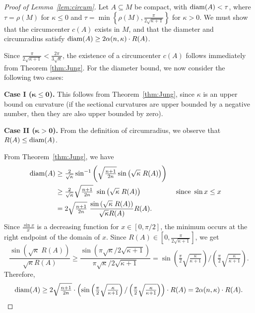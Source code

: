 \documentclass[11pt, reqno, english]{amsart}
\begin{document}
\begin{proof}[Proof of Lemma~\ref{lem:circum}]
Let $A\subseteq M$ be compact, with $\mathrm{diam}(A)< \tau$, where $\tau=\rho(M)$ for $\kappa\le 0$ and $\tau=\min\left\{\rho(M),\tfrac{\pi}{2\sqrt{\kappa+1}}\right\}$ for $\kappa>0$.
We must show that the circumcenter $c(A)$ exists in $M$, and that the diameter and circumradius satisfy $\mathrm{diam}(A)\geq2\alpha(n,\kappa)\cdot R(A)$.

Since $\tfrac{\pi}{2\sqrt{\kappa+1}}<\tfrac{2\pi}{3\sqrt{\kappa}}$, the existence of a circumcenter $c(A)$ follows immediately from Theorem \ref{thm:Jung}. For the diameter bound, we now consider the following two cases:

\noindent\textbf{Case I ($\pmb{\kappa\leq 0}$).}
This follows from Theorem~\ref{thm:Jung}, since $\kappa$ is an upper bound on curvature (if the sectional curvatures are upper bounded by a negative number, then they are also upper bounded by zero).

\noindent\textbf{Case II ($\pmb{\kappa>0}$).}
From the definition of
circumradius, we observe that $R(A)\leq\mathrm{diam}(A)$. 

From Theorem~\ref{thm:Jung}, we have 
\begin{align*}
\diam(A)&\geq\tfrac{2}{\sqrt{\kappa}}\sin^{-1}\left(\sqrt{\tfrac{n+1}{2n}}
\sin\left(\sqrt{\kappa}\;R(A)\right)\right) \\
&\geq\tfrac{2}{\sqrt{\kappa}}\sqrt{\tfrac{n+1}{2n}}\ 
\sin\left(\sqrt{\kappa}\;R(A)\right)&&\text{ since }\sin{x}\leq x \\
&=2\sqrt{\tfrac{n+1}{2n}}\ 
\frac{\sin\left(\sqrt{\kappa}\;R(A)\right)}{\sqrt{\kappa}R(A)}R(A).
\end{align*}
Since $\frac{\sin{x}}{x}$ is a decreasing function for $x\in[0,\pi/2]$, the
minimum occurs at the right endpoint of the domain of $x$.
Since $
R(A)\in\left[0,\tfrac{\pi}{2\sqrt{\kappa+1}}\right]$, we get
\[
\frac{\sin\left(\sqrt{\kappa}\;R(A)\right)}{\sqrt{\kappa}R(A)}
\geq\frac{\sin\left(\pi\sqrt{\kappa}/2\sqrt{\kappa+1}\right)}{\pi\sqrt{\kappa}/2\sqrt{\kappa+1}}
=\sin\left(\tfrac{\pi}{2}\sqrt{\tfrac{\kappa}{\kappa+1}}\right)/\left(\tfrac{\pi}{2}\sqrt{\tfrac{\kappa}{\kappa+1}}\right).
\]
Therefore,
\[
\mathrm{diam}(A)\geq2\sqrt{\tfrac{n+1}{2n}}\cdot\left(\sin\left(\tfrac{\pi}{2}\sqrt{\tfrac{\kappa}{\kappa+1}}\right)/\left(\tfrac{\pi}{2}\sqrt{\tfrac{\kappa}{\kappa+1}}\right)\right)\cdot R(A)
=2\alpha(n,\kappa)\cdot R(A).
\]
\end{proof}
\end{document}
